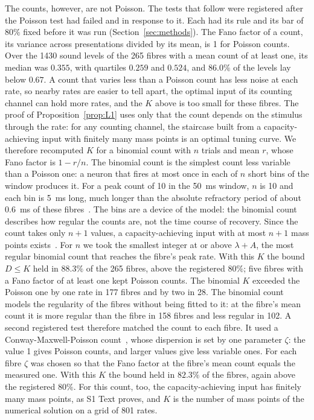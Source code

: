 The counts, however, are not Poisson. The tests that follow were registered after the Poisson test had failed and in response to
it. Each had its rule and its bar of $80\%$ fixed before it was run (Section~\ref{sec:methods}). The Fano factor of a count, its variance across presentations divided by its mean, is 1 for
Poisson counts. Over the 1430 sound levels of the 265 fibres with a mean count of at least one, its median was $0.355$, with
quartiles $0.259$ and $0.524$, and $86.0\%$ of the levels lay below $0.67$. A count that varies less than a Poisson count has less
noise at each rate, so nearby rates are easier to tell apart, the optimal input of its counting channel can hold more rates, and the
$K$ above is too small for these fibres. The proof of Proposition~\ref{prop:L1} uses only that the count depends on the stimulus through the rate: for any counting
channel, the staircase built from a capacity-achieving input with finitely many mass points is an optimal tuning curve. We therefore
recomputed $K$ for a binomial count with $n$ trials and mean $r$, whose Fano factor is $1-r/n$. The binomial count is the simplest
count less variable than a Poisson one: a neuron that fires at most once in each of $n$ short bins of the window produces it. For a peak count of 10 in the 50~ms window,
$n$ is 10 and each bin is 5~ms long, much longer than the absolute refractory period of about 0.6~ms of these fibres~\cite{Heeringa2024}.
The bins are a device of the model: the binomial count describes how regular the counts are, not the time course of recovery. Since the count takes only $n+1$
values, a capacity-achieving input with at most $n+1$ mass points exists~\cite{Favano2026}. For $n$ we took the smallest integer at
or above $\lambda+A$, the most regular binomial count that reaches the fibre's peak rate. With this $K$ the bound $D\le K$ held in
$88.3\%$ of the 265 fibres, above the registered $80\%$; five fibres with a Fano factor of at least one kept Poisson counts. The binomial $K$
exceeded the Poisson one by one rate in 177 fibres and by two in 28. The binomial count models the regularity of the fibres without
being fitted to it: at the fibre's mean count it is more regular than the fibre in 158 fibres and less regular in 102. A second
registered test therefore matched the count to each fibre. It used a Conway-Maxwell-Poisson count~\cite{Shmueli2005}, whose dispersion is set by one
parameter $\zeta$: the value 1 gives Poisson counts, and larger values give less variable ones. For each fibre $\zeta$ was chosen so
that the Fano factor at the fibre's mean count equals the measured one. With this $K$ the bound held in $82.3\%$ of the fibres, again
above the registered $80\%$. For this count, too, the capacity-achieving input has finitely many mass points, as S1 Text proves, and
$K$ is the number of mass points of the numerical solution on a grid of 801 rates.


